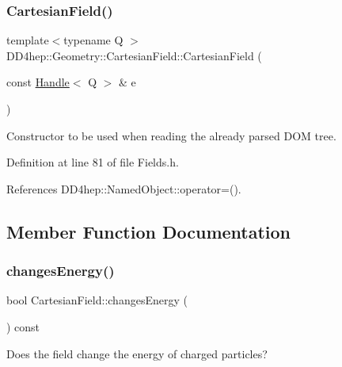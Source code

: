 \subsubsection{\texorpdfstring{Cartesian\+Field()}{CartesianField()}\hspace{0.1cm}{\footnotesize\ttfamily [3/3]}}
{\footnotesize\ttfamily template$<$typename Q $>$ \\
D\+D4hep\+::\+Geometry\+::\+Cartesian\+Field\+::\+Cartesian\+Field (\begin{DoxyParamCaption}\item[{const \hyperlink{class_d_d4hep_1_1_handle}{Handle}$<$ Q $>$ \&}]{e }\end{DoxyParamCaption})\hspace{0.3cm}{\ttfamily [inline]}}



Constructor to be used when reading the already parsed D\+OM tree. 



Definition at line 81 of file Fields.\+h.



References D\+D4hep\+::\+Named\+Object\+::operator=().



\subsection{Member Function Documentation}
\hypertarget{class_d_d4hep_1_1_geometry_1_1_cartesian_field_a9655b32e02ee1a4039252aa8623288da}{}\label{class_d_d4hep_1_1_geometry_1_1_cartesian_field_a9655b32e02ee1a4039252aa8623288da} 
\subsubsection{\texorpdfstring{changes\+Energy()}{changesEnergy()}}
{\footnotesize\ttfamily bool Cartesian\+Field\+::changes\+Energy (\begin{DoxyParamCaption}{ }\end{DoxyParamCaption}) const}



Does the field change the energy of charged particles? 



